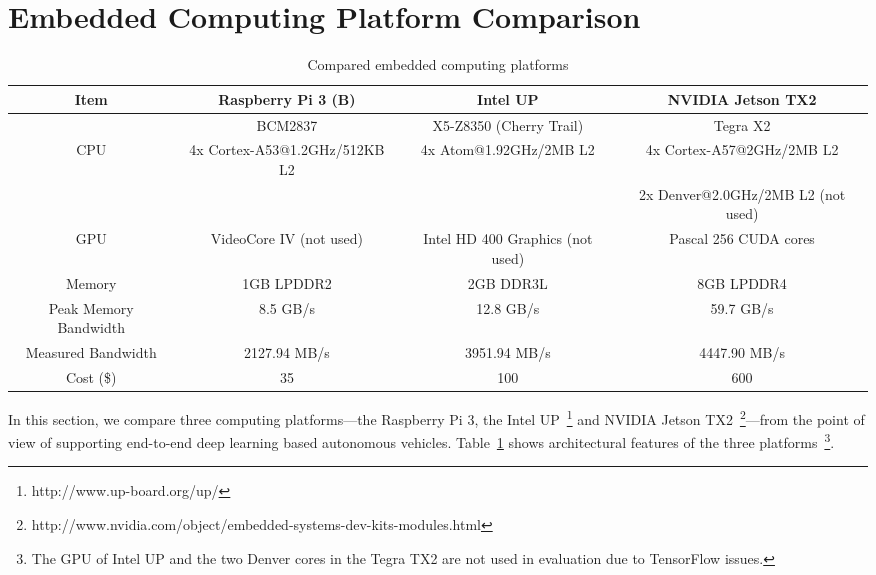 
%

\section{Embedded Computing Platform Comparison}\label{sec:comparison}


\begin{table}[h]
  \centering
  \begin{adjustbox}{width=1\textwidth}
  \begin{tabular}{|c|c|c|c|}
    \hline
    Item    & Raspberry Pi 3 (B)   & Intel UP                  & NVIDIA Jetson TX2\\
    \hline
            & BCM2837              & X5-Z8350 (Cherry Trail)   & Tegra X2 \\
    CPU     & 4x Cortex-A53@1.2GHz/512KB L2  &
              4x Atom@1.92GHz/2MB L2 &
              4x Cortex-A57@2GHz/2MB L2 \\
            &              &              & 2x Denver@2.0GHz/2MB L2 (not used)  \\
    \hline
    GPU     &  VideoCore IV (not used)    &
               Intel HD 400 Graphics (not used) &
               Pascal 256 CUDA cores   \\
    \hline
    Memory  & 1GB LPDDR2   &  2GB DDR3L     & 8GB LPDDR4              \\
    \hline
	Peak Memory Bandwidth & 8.5 GB/s & 12.8 GB/s & 59.7 GB/s \\
	\hline
	Measured Bandwidth & 2127.94 MB/s & 3951.94 MB/s & 4447.90 MB/s \\
	\hline
	Cost (\$) & 35 & 100 & 600 \\
	\hline
  \end{tabular}
  \end{adjustbox}
  \caption{Compared embedded computing platforms}
  \label{tbl:platforms}
\end{table}

In this section, we compare three computing platforms---the Raspberry
Pi 3, the Intel UP~\footnote{http://www.up-board.org/up/} and NVIDIA
Jetson
TX2~\footnote{http://www.nvidia.com/object/embedded-systems-dev-kits-modules.html}---from
the point of view of supporting end-to-end deep learning
based autonomous vehicles. 
Table~\ref{tbl:platforms} shows architectural features of the three
platforms~\footnote{The GPU of Intel UP and the two Denver cores in the
  Tegra TX2 are not used in evaluation due to TensorFlow issues.}.
  
